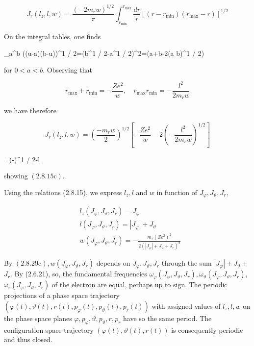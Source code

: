 \documentclass{article}
\begin{document}
\begin{equation*}
J_{r}\left(l_{z}, l, w\right)=\frac{\left(-2 m_{r} w\right)^{1 / 2}}{\pi} \int_{r_{\min }}^{r_{\max }} \frac{d r}{r}\left[\left(r-r_{\min }\right)\left(r_{\max }-r\right)\right]^{1 / 2} \tag{2.8.26}
\end{equation*}
 

On the integral tables, one finds
 
\int_{a}^{b} ((u-a)(b-u))^{1 / 2}=\left(b^{1 / 2}-a^{1 / 2}\right)^{2}=\left(a+b-2(a b)^{1 / 2}\right)
 
for $0<a<b$. Observing that
 
\begin{equation*}
r_{\max }+r_{\min }=-\frac{Z e^{2}}{w}, \quad r_{\max } r_{\min }=-\frac{l^{2}}{2 m_{r} w} \tag{2.8.27}
\end{equation*}
 
we have therefore
 
\begin{equation*}
J_{r}\left(l_{z}, l, w\right)=\left(\frac{-m_{r} w}{2}\right)^{1 / 2}\left[-\frac{Z e^{2}}{w}-2\left(-\frac{l^{2}}{2 m_{r} w}\right)^{1 / 2}\right] \tag{2.8.28}
\end{equation*}
 
 
=\left(-\right)^{1 / 2}-l
 
showing $(2.8 .15 \mathrm{c})$.

Using the relations (2.8.15), we express $l_{z}, l$ and $w$ in function of $J_{\varphi}, J_{\vartheta}, J_{r}$,
 
\begin{align*}
& l_{z}\left(J_{\varphi}, J_{\vartheta}, J_{r}\right)=J_{\varphi}  \tag{2.8.29a}\\
& l\left(J_{\varphi}, J_{\vartheta}, J_{r}\right)=\left|J_{\varphi}\right|+J_{\vartheta}  \tag{2.8.29b}\\
& w\left(J_{\varphi}, J_{\vartheta}, J_{r}\right)=-\frac{m_{r}\left(Z e^{2}\right)^{2}}{2\left(\left|J_{\varphi}\right|+J_{\vartheta}+J_{r}\right)^{2}} \tag{2.8.29c}
\end{align*}
 

By $(2.8 .29 \mathrm{c}), w\left(J_{\varphi}, J_{\vartheta}, J_{r}\right)$ depends on $J_{\varphi}, J_{\vartheta}, J_{r}$ through the sum $\left|J_{\varphi}\right|+J_{\vartheta}+$ $J_{r}$. By (2.6.21), so, the fundamental frequencies $\omega_{\varphi}\left(J_{\varphi}, J_{\vartheta}, J_{r}\right), \omega_{\vartheta}\left(J_{\varphi}, J_{\vartheta}, J_{r}\right)$, $\omega_{r}\left(J_{\varphi}, J_{\vartheta}, J_{r}\right)$ of the electron are equal, perhaps up to sign. The periodic projections of a phase space trajectory $\left(\varphi(t), \vartheta(t), r(t), p_{\varphi}(t), p_{\vartheta}(t), p_{r}(t)\right)$ with assigned values of $l_{z}, l, w$ on the phase space planes $\varphi, p_{\varphi}, \vartheta, p_{\vartheta}, r, p_{r}$ have so the same period. The configuration space trajectory $(\varphi(t), \vartheta(t), r(t))$ is consequently periodic and thus closed.
\end{document}

